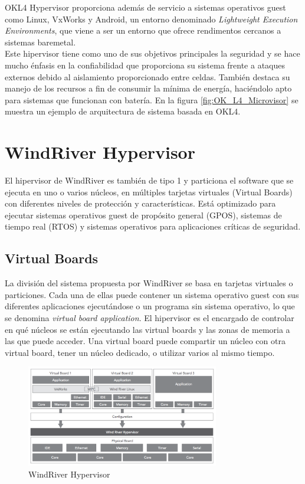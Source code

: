 OKL4 Hypervisor proporciona además de servicio a sistemas operativos guest como Linux, VxWorks y Android, un entorno denominado \textit{Lightweight Execution Environments}, que viene a ser un entorno que ofrece rendimentos cercanos a sistemas baremetal.\\
Este hipervisor tiene como uno de sus objetivos principales la seguridad \cite{okl4_2} y se hace mucho énfasis en la confiabilidad que proporciona su sistema frente a ataques externos debido al aislamiento proporcionado entre celdas. También destaca su manejo de los recursos a fin de consumir la mínima de energía, haciéndolo apto para sistemas que funcionan con batería. En la figura \ref{fig:OK_L4_Microvisor} se muestra un ejemplo de arquitectura de sistema basada en OKL4.


\section{WindRiver Hypervisor}
El hipervisor de WindRiver \cite{windriver_1} es también de tipo 1 y particiona el software que se ejecuta en uno o varios núcleos, en múltiples tarjetas virtuales (Virtual Boards) con diferentes niveles de protección y características. Está optimizado para ejecutar sistemas operativos guest de propósito general (\acrshort{GPOS}), sistemas de tiempo real (\acrshort{RTOS}) y sistemas operativos para aplicaciones críticas de seguridad.
\subsection{Virtual Boards}
La división del sistema propuesta por WindRiver se basa en tarjetas virtuales o particiones. Cada una de ellas puede contener un sistema operativo guest con sus diferentes aplicaciones ejecutándose o un programa sin sistema operativo, lo que se denomina \textit{virtual board application}. El hipervisor es el encargado de controlar en qué núcleos se están ejecutando las virtual boards y las zonas de memoria a las que puede acceder. Una virtual board puede compartir un núcleo con otra virtual board, tener un núcleo dedicado, o utilizar varios al mismo tiempo.
\begin{figure}[h]
	\centering
	\includegraphics[width=0.75\textwidth]{recursos/windriver_hyp.png}
	\caption{WindRiver Hypervisor}
	\label{fig:windriver_hyp}
\end{figure}

